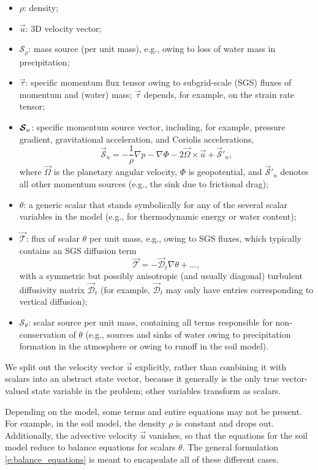 \documentclass{report}
\begin{document}
\begin{itemize}
    \item $\rho$: density;
    \item $\vec{u}$: 3D velocity vector;
    \item $\mathcal{S}_\rho$: mass source (per unit mass), e.g., owing to loss of water mass in precipitation;
    \item $\vec{\tau}$: specific momentum flux tensor owing to subgrid-scale (SGS) fluxes of momentum and (water) mass; $\vec{\tau}$ depends, for example, on the strain rate tensor; 
    \item $\boldsymbol{{\mathcal{S}}}_u$: specific momentum source vector, including, for example, pressure gradient, gravitational acceleration, and Coriolis accelerations, 
    \begin{equation}\label{e:momentum_source}
    \vec{\mathcal{S}}_u = -\frac{1}{\rho} \nabla p - \nabla\Phi - 2\vec{\Omega} \times \vec{u} + \vec{\mathcal{S}}'_u,
    \end{equation}
    where $\vec{\Omega}$ is the planetary angular velocity, $\Phi$ is geopotential, and $\vec{\mathcal{S}}'_u$ denotes all other momentum sources (e.g., the sink due to frictional drag);
    \item $\theta$: a generic scalar that stands symbolically for any of the several scalar variables in the model (e.g., for thermodynamic energy or water content);
    \item $\vec{\mathcal{T}}$: flux of scalar $\theta$ per unit mass, e.g., owing to SGS fluxes, which typically contains an SGS diffusion term
    \[
    \vec{\mathcal{T}} = - \vec{\mathcal{D}}_t \nabla \theta + \dots,
    \]
    with a symmetric but possibly anisotropic (and usually diagonal) turbulent diffusivity matrix $\vec{\mathcal{D}}_t$ (for example, $\vec{\mathcal{D}}_t$ may only have entries corresponding to vertical diffusion);
    \item $\mathcal{S}_\theta$: scalar source per unit mass, containing all terms responsible for non-conservation of $\theta$ (e.g., sources and sinks of water owing to precipitation formation in the atmosphere or owing to runoff in the soil model).
 \end{itemize}
 We split out the velocity vector $\vec{u}$ explicitly, rather than combining it with scalars into an abstract state vector, because it generally is the only true vector-valued state variable in the problem; other variables transform as scalars. 

Depending on the model, some terms and entire equations may not be present. For example, in the soil model, the density $\rho$ is constant and drops out. Additionally, the advective velocity $\vec{u}$ vanishes, so that the equations for the soil model reduce to balance equations for scalars $\theta$. The general formulation \eqref{e:balance_equations} is meant to encapsulate all of these different cases.
\end{document}
